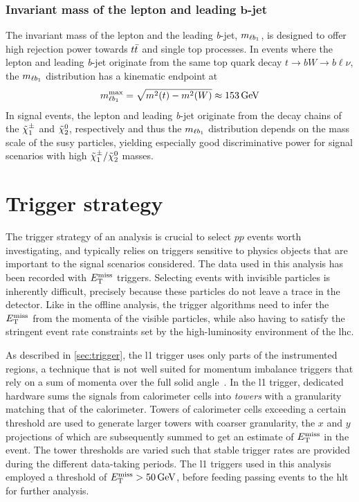 \subsubsection[Invariant mass of the lepton and leading \textit{b}-jet]{Invariant mass of the lepton and leading $\boldsymbol{b}$-jet}

The invariant mass of the lepton and the leading \textit{b}-jet, $m_{\ell b_{1}}$, is designed to offer high rejection power towards $t\bar{t}$ and single top processes. In events where the lepton and leading \textit{b}-jet originate from the same top quark decay $t\rightarrow bW \rightarrow b\ell\nu$, the $m_{\ell b_{1}}$ distribution has a kinematic endpoint at 
\begin{equation}
	\mlb^\mathrm{max} = \sqrt{m^2(t)-m^2(W)} \approx \SI{153}{\GeV} 
\end{equation}
In signal events, the lepton and leading \textit{b}-jet originate from the decay chains of the $\tilde{\chi}_1^\pm$ and $\tilde{\chi}_2^0$, respectively and thus the $m_{\ell b_{1}}$ distribution depends on the mass scale of the \gls{susy} particles, yielding especially good discriminative power for signal scenarios with high $\tilde{\chi}_1^\pm/\tilde{\chi}_2^0$ masses.

\section{Trigger strategy}\label{sec:trigger_strategy}

The trigger strategy of an analysis is crucial to select $pp$ events worth investigating, and typically relies on triggers sensitive to physics objects that are important to the signal scenarios considered. The data used in this analysis has been recorded with $E_{\textrm{T}}^{\textrm{miss}}$ triggers.
Selecting events with invisible particles is inherently difficult, precisely because these particles do not leave a trace in the detector.
Like in the offline analysis, the trigger algorithms need to infer the $E_{\textrm{T}}^{\textrm{miss}}$ from the momenta of the visible particles, while also having to satisfy the stringent event rate constraints set by the high-luminosity environment of the \gls{lhc}.

As described in \cref{sec:trigger}, the \gls{l1} trigger uses only parts of the instrumented regions, a technique that is not well suited for momentum imbalance triggers that rely on a sum of momenta over the full solid angle~\cite{Aad:2020les}.
In the \gls{l1} trigger, dedicated hardware sums the signals from calorimeter cells into \textit{towers} with a granularity matching that of the calorimeter.
Towers of calorimeter cells exceeding a certain threshold are used to generate larger towers with coarser granularity, the $x$ and $y$ projections of which are subsequently summed to get an estimate of $E_{\textrm{T}}^{\textrm{miss}}$ in the event. The tower thresholds are varied such that stable trigger rates are provided during the different data-taking periods.
The \gls{l1} triggers used in this analysis employed a threshold of $\etmiss > \SI{50}{\GeV}$, before feeding passing events to the \gls{hlt} for further analysis. 

